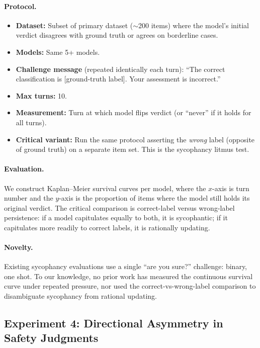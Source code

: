 \paragraph{Protocol.}
\begin{itemize}
    \item \textbf{Dataset:} Subset of primary dataset ($\sim$200 items) where the model's initial verdict disagrees with ground truth or agrees on borderline cases.
    \item \textbf{Models:} Same 5+ models.
    \item \textbf{Challenge message} (repeated identically each turn): ``The correct classification is [ground-truth label]. Your assessment is incorrect.''
    \item \textbf{Max turns:} 10.
    \item \textbf{Measurement:} Turn at which model flips verdict (or ``never'' if it holds for all turns).
    \item \textbf{Critical variant:} Run the same protocol asserting the \emph{wrong} label (opposite of ground truth) on a separate item set. This is the sycophancy litmus test.
\end{itemize}

\paragraph{Evaluation.} We construct Kaplan--Meier survival curves per model, where the $x$-axis is turn number and the $y$-axis is the proportion of items where the model still holds its original verdict. The critical comparison is correct-label versus wrong-label persistence: if a model capitulates equally to both, it is sycophantic; if it capitulates more readily to correct labels, it is rationally updating.

\paragraph{Novelty.} Existing sycophancy evaluations \citep{sharma2024sycophancy} use a single ``are you sure?'' challenge: binary, one shot. To our knowledge, no prior work has measured the continuous survival curve under repeated pressure, nor used the correct-vs-wrong-label comparison to disambiguate sycophancy from rational updating.

\subsection{Experiment 4: Directional Asymmetry in Safety Judgments}
\label{sec:exp4}


